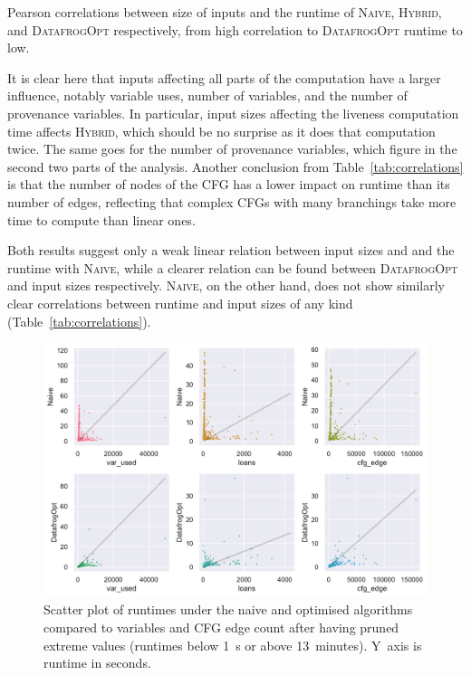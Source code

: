 \documentclass[11pt,a4paper,twoside,openany]{report}
\begin{document}
\begin{table}[ht]
  
  \caption[Pearson Correlations Between Sizes of Inputs and Runtime]{Pearson
    correlations between size of inputs and the runtime of \textsc{Naive},
    \textsc{Hybrid}, and \textsc{DatafrogOpt} respectively, from high
    correlation to \textsc{DatafrogOpt} runtime to low.}
  \label{tab:correlations}
\end{table}%

It is clear here that inputs affecting all parts of the computation have a
larger influence, notably variable uses, number of variables, and the number of
provenance variables. In particular, input sizes affecting the liveness
computation time affects \textsc{Hybrid}, which should be no surprise as it does
that computation twice. The same goes for the number of provenance variables,
which figure in the second two parts of the analysis. Another conclusion from
Table~\ref{tab:correlations} is that the number of nodes of the CFG has a lower
impact on runtime than its number of edges, reflecting that complex CFGs with
many branchings take more time to compute than linear ones.

Both results suggest only a weak linear relation between input sizes and
and the runtime with \textsc{Naive}, while a clearer relation can be
found between \textsc{DatafrogOpt} and input sizes respectively. \textsc{Naive},
on the other hand, does not show similarly clear correlations between runtime
and input sizes of any kind (Table~\ref{tab:correlations}).

\begin{figure}
  \includegraphics[width=0.9\linewidth]{Graphs/corr_scatter.pdf}
  \caption[Scatter Plot of Runtimes On Two Polonius Variants vs. nr. of CFG
  Edges and Variables]{Scatter plot of runtimes under the naive and optimised
    algorithms compared to variables and CFG edge count after having pruned
    extreme values (runtimes below 1~s or above 13~minutes). Y~axis is runtime
    in seconds.}
  \label{fig:input-scatter}
\end{figure}
\end{document}
